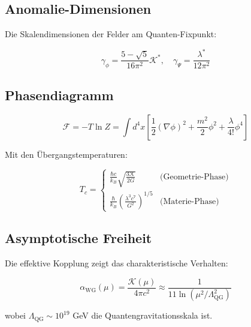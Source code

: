 \subsection{Anomalie-Dimensionen}

Die Skalendimensionen der Felder am Quanten-Fixpunkt:

\begin{equation}
\gamma_\phi = \frac{5-\sqrt{5}}{16\pi^2}\mathcal{K}^*, \quad \gamma_\Psi = \frac{\lambda^*}{12\pi^2}
\end{equation}

\subsection{Phasendiagramm}

\begin{equation}
\mathcal{F} = -T \ln Z = \int d^4x \left[ \frac{1}{2}(\nabla \phi)^2 + \frac{m^2}{2}\phi^2 + \frac{\lambda}{4!}\phi^4 \right]
\end{equation}

Mit den Übergangstemperaturen:

\begin{equation}
T_c = \begin{cases}
\frac{\hbar c}{k_B}\sqrt{\frac{3\mathcal{K}}{2G}} & \text{(Geometrie-Phase)} \\
\frac{\hbar}{k_B}\left(\frac{\lambda^3c^7}{G^2}\right)^{1/5} & \text{(Materie-Phase)}
\end{cases}
\end{equation}

\subsection{Asymptotische Freiheit}

Die effektive Kopplung zeigt das charakteristische Verhalten:

\begin{equation}
\alpha_{\text{WG}}(\mu) = \frac{\mathcal{K}(\mu)}{4\pi c^2} \approx \frac{1}{11\ln(\mu^2/\Lambda^2_{\text{QG}})}
\end{equation}

wobei $\Lambda_{\text{QG}} \sim 10^{19}$ GeV die Quantengravitationsskala ist.